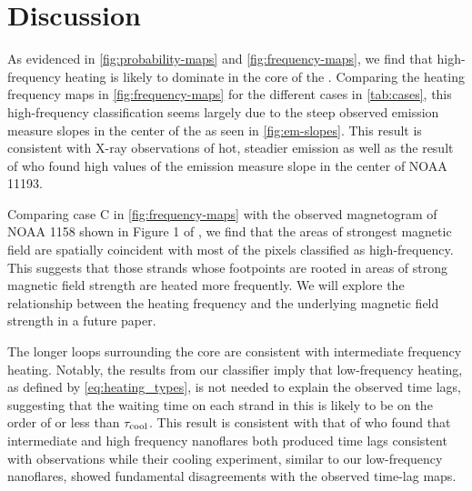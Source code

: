 \section{Discussion}\label{sec:discussion}

As evidenced in \autoref{fig:probability-maps} and \autoref{fig:frequency-maps}, we find that high-frequency heating is likely to dominate in the core of the \AR. 
Comparing the heating frequency maps in \autoref{fig:frequency-maps} for the different cases in \autoref{tab:cases}, this high-frequency classification seems largely due to the steep observed emission measure slopes in the center of the \AR{} as seen in \autoref{fig:em-slopes}.
This result is consistent with X-ray observations of hot, steadier emission \citep{warren_evidence_2010,warren_constraints_2011,winebarger_using_2011} as well as the result of \citet{del_zanna_evolution_2015} who found high values of the emission measure slope in the center of NOAA 11193.

Comparing case C in \autoref{fig:frequency-maps} with the observed magnetogram of NOAA 1158 shown in Figure 1 of , we find that the areas of strongest magnetic field are spatially coincident with most of the pixels classified as high-frequency.
This suggests that those strands whose footpoints are rooted in areas of strong magnetic field strength are heated more frequently.
We will explore the relationship between the heating frequency and the underlying magnetic field strength in a future paper.

The longer loops surrounding the core are consistent with intermediate frequency heating.
Notably, the results from our classifier imply that low-frequency heating, as defined by \autoref{eq:heating_types}, is not needed to explain the observed time lags, suggesting that the waiting time on each strand in this \AR{} is likely to be on the order of or less than $\tau_\textup{cool}$.
This result is consistent with that of \citet{bradshaw_patterns_2016} who found that intermediate and high frequency nanoflares both produced time lags consistent with observations while their cooling experiment, similar to our low-frequency nanoflares, showed fundamental disagreements with the observed time-lag maps.


